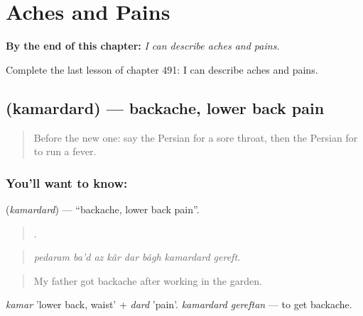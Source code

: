 
\chapter{Aches and Pains}
\label{ch:fa-aches-and-pains}

\begin{chapteropening}
\textbf{By the end of this chapter:} \emph{I can describe aches and pains.}

Complete the last lesson of chapter 491: I can describe aches and pains.
\end{chapteropening}

\section[\texorpdfstring{\fa{کمردرد} (kamardard)}{کمردرد (kamardard)}]{ (kamardard) — backache, lower back pain}

\label{lesson:FA-C491-kamardard}



\begin{quote}
Before the new one: say the Persian for a sore throat, then the Persian for to run a fever.
\end{quote}

\subsection*{You'll want to know: }
\textbf{} (\emph{kamardard}) — \textquotedblleft{}backache, lower back pain\textquotedblright{}.

\begin{quote}
       .
\end{quote}

\begin{quote}
\emph{pedaram ba'd az kâr dar bâgh kamardard gereft.}
\end{quote}

\begin{quote}
My father got backache after working in the garden.
\end{quote}

\emph{kamar} 'lower back, waist' + \emph{dard} 'pain'. \emph{kamardard gereftan} — to get backache.

